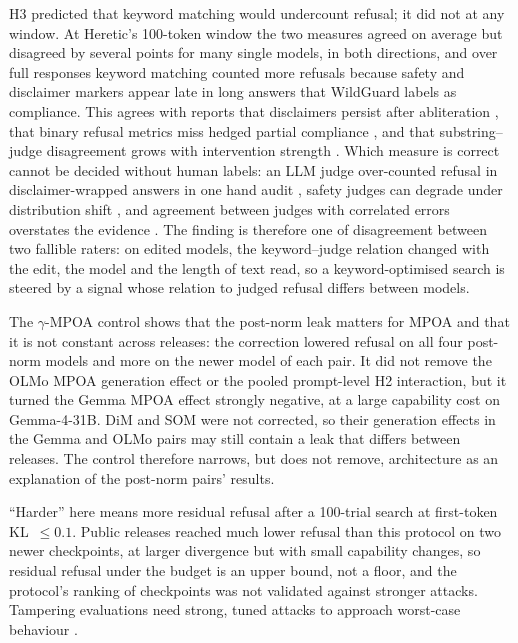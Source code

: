 H3 predicted that keyword matching would undercount refusal; it did not at
any window. At Heretic's 100-token window the two measures agreed on average
but disagreed by several points for many single models, in both directions,
and over full responses keyword matching counted more refusals because safety
and disclaimer markers appear late in long answers that WildGuard labels as
compliance. This agrees with reports that disclaimers persist after
abliteration \cite{wuhrmann2026measuring}, that binary refusal metrics miss
hedged partial compliance \cite{weidener2026refusalbench}, and that
substring--judge disagreement grows with intervention strength
\cite{rocchetti2026refusal}. Which measure is correct cannot be decided without
human labels: an LLM judge over-counted refusal in disclaimer-wrapped answers
in one hand audit \cite{rocchetti2026refusal}, safety judges can degrade under
distribution shift \cite{schwinn2026coin}, and agreement between judges with
correlated errors overstates the evidence \cite{hossain2026agreement}. The
finding is therefore one of disagreement between two fallible raters: on
edited models, the keyword--judge relation changed with the edit, the model
and the length of text read, so a keyword-optimised search is steered by a
signal whose relation to judged refusal differs between models.

The $\gamma$-MPOA control shows that the post-norm leak matters for MPOA and
that it is not constant across releases: the correction lowered refusal on all
four post-norm models and more on the newer model of each pair. It did not
remove the OLMo MPOA generation effect or the pooled prompt-level H2
interaction, but it turned the Gemma MPOA effect strongly negative, at a large
capability cost on Gemma-4-31B. DiM and SOM were not corrected, so their
generation effects in the Gemma and OLMo pairs may still contain a leak that
differs between releases. The control therefore narrows, but does not remove,
architecture as an explanation of the post-norm pairs' results.

``Harder'' here means more residual refusal after a 100-trial search at
first-token KL~$\le 0.1$. Public releases reached much lower refusal than this
protocol on two newer checkpoints, at larger divergence but with small
capability changes, so residual refusal under the budget is an upper bound,
not a floor, and the protocol's ranking of checkpoints was not validated
against stronger attacks. Tampering evaluations need strong, tuned attacks to
approach worst-case behaviour \cite{che2025model,hossain2026tamperbench}.

